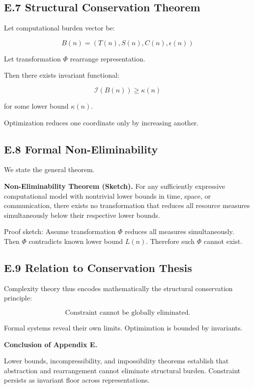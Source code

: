 \documentclass[11pt,openany]{book}
\begin{document}
\subsection{E.7 Structural Conservation Theorem}

Let computational burden vector be:

\[
B(n) = (T(n), S(n), C(n), \epsilon(n))
\]

Let transformation $\Phi$ rearrange representation.

Then there exists invariant functional:

\[
\mathcal{I}(B(n)) \ge \kappa(n)
\]

for some lower bound $\kappa(n)$.

Optimization reduces one coordinate only by increasing another.

\subsection{E.8 Formal Non-Eliminability}

We state the general theorem.

\medskip

\textbf{Non-Eliminability Theorem (Sketch).}
For any sufficiently expressive computational model with 
nontrivial lower bounds in time, space, or communication, 
there exists no transformation that reduces all resource measures 
simultaneously below their respective lower bounds.

\medskip

Proof sketch: 
Assume transformation $\Phi$ reduces all measures simultaneously.
Then $\Phi$ contradicts known lower bound $L(n)$.
Therefore such $\Phi$ cannot exist.

\subsection{E.9 Relation to Conservation Thesis}

Complexity theory thus encodes mathematically 
the structural conservation principle:

\[
\text{Constraint cannot be globally eliminated.}
\]

Formal systems reveal their own limits.
Optimization is bounded by invariants.

\bigskip

\textbf{Conclusion of Appendix E.}

Lower bounds, incompressibility, and impossibility theorems 
establish that abstraction and rearrangement 
cannot eliminate structural burden. 
Constraint persists as invariant floor across representations.
\end{document}
